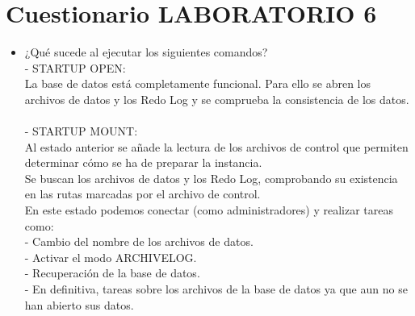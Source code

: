 \section{Cuestionario LABORATORIO 6} 
	\begin{itemize}
  \item ¿Qué sucede al ejecutar los siguientes comandos?
	  \\- STARTUP OPEN:
    \\La base de datos está completamente funcional. Para ello se abren los archivos de datos y los Redo Log y se comprueba la consistencia de los datos.
    \\
    \\- STARTUP MOUNT:
    \\Al estado anterior se añade la lectura de los archivos de control que permiten determinar cómo se ha de preparar la instancia. 
    \\Se buscan los archivos de datos y los Redo Log, comprobando su existencia en las rutas marcadas por el archivo de control.
    \\En este estado podemos conectar (como administradores) y realizar tareas como:
     \\- Cambio del nombre de los archivos de datos.
     \\- Activar el modo ARCHIVELOG.
     \\- Recuperación de la base de datos.
     \\- En definitiva, tareas sobre los archivos de la base de datos ya que aun no se han abierto sus datos.
      

\end{itemize}
